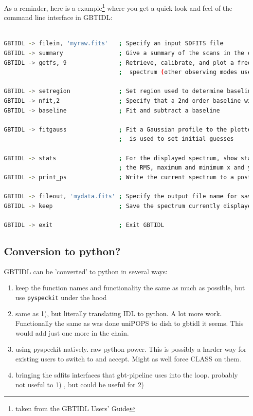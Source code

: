 \documentclass[12pt,a4paper]{article}
\begin{document}
As a reminder, here is a example\footnote{taken from the GBTIDL Users' Guide}
where you get a quick look and feel of the command line interface in GBTIDL:

\begin{lstlisting}[language=bash]
% gbtidl                         ; Start GBTIDL from the unix prompt

GBTIDL -> filein, 'myraw.fits'   ; Specify an input SDFITS file
GBTIDL -> summary                ; Give a summary of the scans in the opened data file
GBTIDL -> getfs, 9               ; Retrieve, calibrate, and plot a frequency switched  
                                 ;  spectrum (other observing modes use different commands)

GBTIDL -> setregion              ; Set region used to determine baseline
GBTIDL -> nfit,2                 ; Specify that a 2nd order baseline will be used
GBTIDL -> baseline               ; Fit and subtract a baseline

GBTIDL -> fitgauss               ; Fit a Gaussian profile to the plotted spectrum.  The mouse
                                 ;  is used to set initial guesses

GBTIDL -> stats                  ; For the displayed spectrum, show statistics such as
                                 ; the RMS, maximum and minimum x and y values
GBTIDL -> print_ps               ; Write the current spectrum to a postscript file

GBTIDL -> fileout, 'mydata.fits' ; Specify the output file name for saved data
GBTIDL -> keep                   ; Save the spectrum currently displayed
		    
GBTIDL -> exit                   ; Exit GBTIDL

\end{lstlisting}

\subsection{Conversion to python?}

GBTIDL can be 'converted' to python in several ways:

\begin{enumerate}
\item
  keep the function names and functionality the same as much as possible,
    but use {\tt pyspeckit} under the hood
\item
  same as 1), but literally  translating IDL to python. A lot more work.
  Functionally the same as  was done uniPOPS to dish to gbtidl it seems.
  This would add just one more in the chain.
\item
  using pyspeckit natively. raw python power. This is possibly a harder way for
  existing users to switch to and accept. Might as well force CLASS on them.
\item
  bringing the sdfits interfaces that gbt-pipeline uses into the loop.
probably not useful to 1) , but could be useful for 2)

\end{enumerate}
\end{document}
